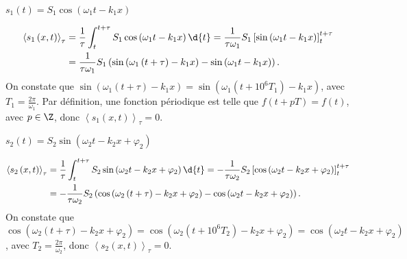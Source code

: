 \begin{enonce}
$s_1\left( t \right) = S_1 \cos \left( \omega_1 t - k_1 x \right)$
\end{enonce}


\begin{corrige}
	\begin{align*}
	\left< s_1\left( x,t \right) \right>_{\tau} &= \frac{1}{\tau} \int_t^{t+\tau} S_1 \cos \left( \omega_1 t - k_1 x \right) \d{t} = \frac{1}{\tau \omega_1} S_1 \left[ \sin\left( \omega_1 t - k_1 x \right) \right]^{t+\tau}_{t} \\
	&= \frac{1}{\tau \omega_1} S_1 \left( \sin\left( \omega_1 \left( t+\tau \right) - k_1 x \right) - \sin\left( \omega_1 t - k_1 x \right)  \right).
	\end{align*}
	On constate que $\sin\left( \omega_1 \left( t+\tau \right) - k_1 x \right) = \sin\left( \omega_1 \left( t+10^6T_1 \right) - k_1 x \right)$, avec $T_1 = \frac{2\pi}{\omega_1}$. Par définition, une fonction périodique est telle que $f(t+pT) = f(t)$, avec $p \in \Z$, donc $\left< s_1\left( x,t \right) \right>_{\tau}=0$.
\end{corrige}




\begin{enonce}
$s_2\left( t \right) = S_2 \sin \left( \omega_2 t - k_2 x + \varphi_2\right)$ 
\end{enonce}
	
	
\begin{corrige}
	\begin{align*}
	\left< s_2\left( x,t \right) \right>_{\tau} &= \frac{1}{\tau} \int_t^{t+\tau} S_2 \sin \left( \omega_2 t - k_2 x + \varphi_2 \right) \d{t} = -\frac{1}{\tau \omega_2} S_2 \left[ \cos\left( \omega_2 t - k_2 x + \varphi_2\right) \right]^{t+\tau}_{t} \\
	&= -\frac{1}{\tau \omega_2} S_2 \left( \cos\left( \omega_2 \left( t+\tau \right) - k_2 x + \varphi_2 \right) - \cos\left( \omega_2 t - k_2 x + \varphi_2\right)  \right).
	\end{align*}
	On constate que $\cos\left( \omega_2 \left( t+\tau \right) - k_2 x + \varphi_2 \right) = \cos\left( \omega_2 \left( t+10^6T_2 \right) - k_2 x + \varphi_2\right) = \cos\left( \omega_2 t - k_2 x + \varphi_2\right)$, avec $T_2 = \frac{2\pi}{\omega_2}$, donc $\left< s_2\left( x,t \right) \right>_{\tau}=0$.
	
\end{corrige}

